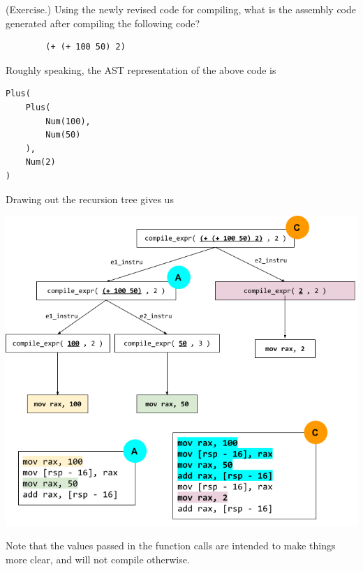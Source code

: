 \begin{mdframed}
    (Exercise.) Using the newly revised code for compiling, what is the assembly code generated after compiling the following code?
    \begin{verbatim}
        (+ (+ 100 50) 2)\end{verbatim}

    \begin{mdframed}
        Roughly speaking, the AST representation of the above code is 
        \begin{verbatim}
Plus(
    Plus(
        Num(100),
        Num(50)
    ),
    Num(2)
)\end{verbatim}

        Drawing out the recursion tree gives us 
        \begin{center}
            \includegraphics[scale=0.57]{assets/add_asm.png}
        \end{center}
        Note that the values passed in the function calls are intended to make things more clear, and will not compile otherwise. 
    \end{mdframed}
\end{mdframed}

\bigskip 


